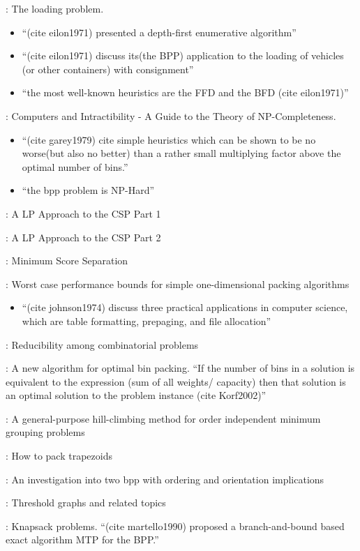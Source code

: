 \documentclass[oribibl]{llncs}
\begin{document}
\cite{eilon1971}: The loading problem. 
\begin{itemize}
	\item ``(cite eilon1971) presented a depth-first enumerative algorithm''
	\item ``(cite eilon1971) discuss its(the BPP) application to the loading of vehicles (or other containers) with consignment'' 
	\item ``the most well-known heuristics are the FFD and the BFD (cite eilon1971)''
\end{itemize}
\cite{garey1979}: Computers and Intractibility - A Guide to the Theory of NP-Completeness. 
\begin{itemize}
	\item ``(cite garey1979) cite simple heuristics which can be shown to be no
	worse(but also no better) than a rather small multiplying factor above the optimal number of bins.''
	\item ``the bpp problem is NP-Hard''
\end{itemize}

\cite{gilmore1961}: A LP Approach to the CSP Part 1

\cite{gilmore1963}: A LP Approach to the CSP Part 2

\cite{goulimis2004}: Minimum Score Separation

\cite{johnson1974}: Worst case performance bounds for simple one-dimensional packing algorithms
\begin{itemize}
	\item ``(cite johnson1974) discuss three practical applications in computer science, which are table formatting, prepaging, and file allocation''
\end{itemize}

\cite{karp1972}: Reducibility among combinatorial problems

\cite{korf2002}: A new algorithm for optimal bin packing. ``If the number of bins in a solution is equivalent to the expression (sum of all weights/ capacity) then that solution is an optimal solution to the problem instance (cite Korf2002)'' 

\cite{lewis2009}: A general-purpose hill-climbing method for order independent minimum grouping problems

\cite{lewis2017}: How to pack trapezoids

\cite{lewis2011}: An investigation into two bpp with ordering and orientation implications

\cite{mahadev1995}: Threshold graphs and related topics

\cite{martello1990b}: Knapsack problems. ``(cite martello1990) proposed a branch-and-bound based exact algorithm MTP for the BPP.'' 






%
\end{document}
